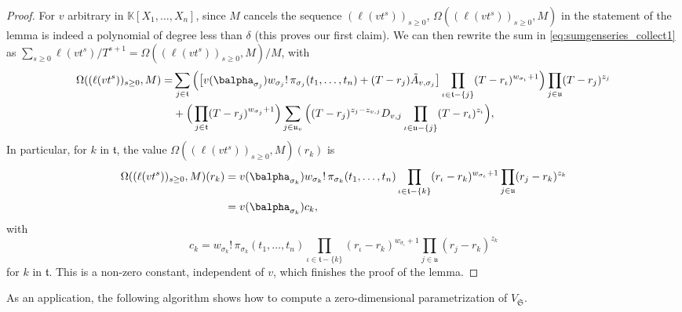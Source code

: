 \documentclass[12pt]{article}
\def\K {\ensuremath{\mathbb{K}}}
\def\K{\mathbb{K}}
\begin{document}
\begin{proof}
	For $v$ arbitrary in $\K[X_1,\dots,X_n]$, since  $M$ cancels the sequence
	$(\ell(v t^s))_{s \ge 0}$, $\Omega((\ell(v t^s))_{s \ge 0} ,M)$ in the statement of
	the lemma is indeed a polynomial of degree less than $\delta$ (this
	proves our first claim). We can then rewrite the
	sum in \cref{eq:sumgenseries_collect1} as $ \sum_{s \ge 0} \ell(v
	t^s)/T^{s+1} =\Omega((\ell(v t^s))_{s \ge 0} ,M)/M$, with
	\begin{align*}
	\Omega((\ell(v t^s))_{s \ge 0} ,M)=&\sum_{j \in \mathfrak{t}} \Big(\big[
	v(\balpha_{\sigma_{j}})  w_{\sigma_j}!\, \pi_{\sigma_j}(t_1,\dots,t_n)
	+ (T-r_j)\tilde A_{v,\sigma_j}\big]
	\prod_{\iota \in \mathfrak{t}-\{j\}}(T-r_{\iota} )^{w_{\sigma_{\iota}}+1}
	\Big)\prod_{j \in \mathfrak{u}}(T-r_j )^{z_j}
	\\
	&+
	\Big(\prod_{j \in \mathfrak{t}}(T-r_{j} )^{w_{\sigma_j}+1}\Big)
	\sum_{j \in \mathfrak{u}_v} \Big (
	(T-r_j)^{z_{j}-z_{v,j}} D_{v,j}
	\prod_{\iota \in \mathfrak{u}-\{j\}}(T-r_{\iota} )^{z_{\iota}}\Big),
	\end{align*}
	In particular, 
	for $k$ in $\mathfrak{t}$,
	the value $\Omega((\ell(v t^s))_{s \ge 0} ,M)(r_k)$ is 
	\begin{align*}
	\Omega((\ell(v t^s))_{s \ge 0} ,M)(r_k)&= v(\balpha_{\sigma_{k}}) w_{\sigma_k}!\, \pi_{\sigma_k}(t_1,\dots,t_n)
	\prod_{\iota \in \mathfrak{t}-\{k\}}(r_\iota-r_{k} )^{w_{\sigma_{\iota}}+1}
	\prod_{j \in \mathfrak{u}}(r_j-r_{k} )^{z_{k}}\\
	&= v(\balpha_{\sigma_{k}}) c_{k},
	\end{align*}
	with 
	$$c_{k}=
	w_{\sigma_k}!\, \pi_{\sigma_k}(t_1,\dots,t_n)
	\prod_{\iota \in \mathfrak{t}-\{k\}}(r_\iota-r_{k} )^{w_{\sigma_{\iota}}+1}
	\prod_{j \in \mathfrak{u}}(r_j-r_{k} )^{z_{k}}$$
	for $k$ in $\mathfrak{t}$. This is a non-zero constant, independent 
	of $v$, which finishes the proof of the lemma.
\end{proof}

As an application, the following algorithm shows how to compute a
zero-dimensional parametrization of $V_{\mathfrak{S}}$.
\end{document}
